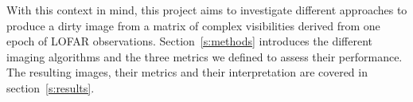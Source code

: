 \documentclass[11pt]{article}
\begin{document}
With this context in mind, this project aims to investigate different approaches to produce a dirty image from a matrix of complex visibilities derived from one epoch of LOFAR observations.
Section~\ref{s:methods} introduces the different imaging algorithms and the three metrics we defined to assess their performance.
The resulting images, their metrics and their interpretation are covered in section~\ref{s:results}.








\end{document}
